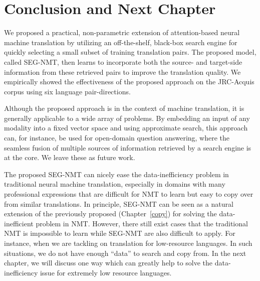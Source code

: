 \section{Conclusion and Next Chapter}

We proposed a practical, non-parametric extension of attention-based neural machine translation by utilizing an off-the-shelf, black-box search engine for quickly selecting a small subset of training translation pairs. The proposed model, called SEG-NMT, then learns to incorporate both the source- and target-side information from these retrieved pairs to improve the translation quality. We empirically showed the effectiveness of the proposed approach on the JRC-Acquis corpus using six language pair-directions. 

Although the proposed approach is in the context of machine translation, it is generally applicable to a wide array of problems. By embedding an input of any modality into a fixed vector space and using approximate search\citep{FAISS}, this approach can, for instance, be used for open-domain question answering, where the seamless fusion of multiple sources of information retrieved by a search engine is at the core. We leave these as future work.

The proposed SEG-NMT can nicely ease the data-inefficiency problem in traditional neural machine translation, especially in domains with many professional expressions that are difficult for NMT to learn but easy to copy over from similar translations. 	In principle, SEG-NMT  can be seen as a natural extension of the previously proposed \copynet (Chapter~\ref{copy}) for solving the data-inefficient problem in NMT.  However, there still exist cases that the traditional NMT is impossible to learn while SEG-NMT are also difficult to apply. For instance, when we are tackling on translation for low-resource languages. In such situations, we do not have enough ``data'' to search and copy from. In the next chapter, we will discuss one way which can greatly help to solve the data-inefficiency issue for extremely low resource languages.


